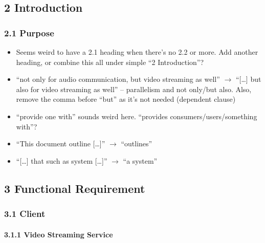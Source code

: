 \documentclass{article}
\begin{document}

\subsection{2 Introduction}

\subsubsection{2.1 Purpose}

\begin{itemize}
    \item Seems weird to have a 2.1 heading when there's no 2.2 or more.  Add
        another heading, or combine this all under simple ``2 Introduction''?
    \item ``not only for audio communication, but video streaming as well''
        $\rightarrow$ ``[\dots] but also for video streaming as well'' --
        parallelism and not only/but also.  Also, remove the comma before
        ``but'' as it's not needed (dependent clause)
    \item ``provide one with'' sounds weird here.  ``provides
              consumers/users/something with''?
    \item ``This document outline [\dots]'' $\rightarrow$ ``outlines''
    \item ``[\dots] that such as system [\dots]'' $\rightarrow$ ``a system''
\end{itemize}


\subsection{3 Functional Requirement}

\subsubsection{3.1 Client}

\paragraph{3.1.1 Video Streaming Service}
\end{document}
